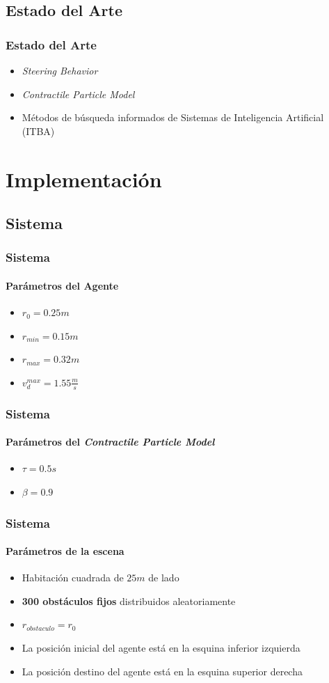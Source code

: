 \documentclass[hyperref={pdfpagelayout=SinglePage}]{beamer}
\begin{document}
\subsection{Estado del Arte}

\begin{frame}
\frametitle{Estado del Arte}
\begin{itemize}
	\item \textit{Steering Behavior}
	\item \textit{Contractile Particle Model}
	\item Métodos de búsqueda informados de Sistemas de Inteligencia Artificial (ITBA)
\end{itemize}
\end{frame}

\section{Implementación}

\subsection{Sistema}

\begin{frame}
\frametitle{Sistema}
\framesubtitle{Parámetros del Agente}
\begin{itemize}
	\item $r_{0} = 0.25m$
	\item $r_{min} = 0.15m$
	\item $r_{max} = 0.32m$
	\item $v_{d}^{max} = 1.55 \frac{m}{s}$
\end{itemize}
\end{frame}

\begin{frame}
\frametitle{Sistema}
\framesubtitle{Parámetros del \textit{Contractile Particle Model}}
\begin{itemize}
		\item $\tau = 0.5s$
		\item $\beta = 0.9$
\end{itemize}
\end{frame}

\begin{frame}
\frametitle{Sistema}
\framesubtitle{Parámetros de la escena}
\begin{itemize}
	\item Habitación cuadrada de $25m$ de lado
	\item \textbf{300 obstáculos fijos} distribuidos aleatoriamente
	\item $r_{obstaculo} = r_{0}$
	\item La posición inicial del agente está en la esquina inferior izquierda
	\item La posición destino del agente está en la esquina superior derecha 
\end{itemize}
\end{frame}
\end{document}
